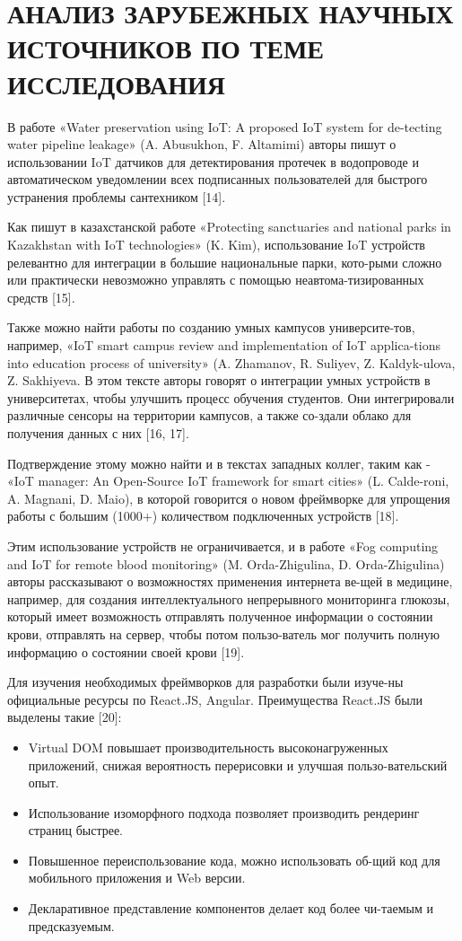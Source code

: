 \section{АНАЛИЗ ЗАРУБЕЖНЫХ НАУЧНЫХ ИСТОЧНИКОВ ПО ТЕМЕ ИССЛЕДОВАНИЯ}


В работе «Water preservation using IoT: A proposed IoT system for de-tecting water pipeline leakage» (A. Abusukhon, F. Altamimi) авторы пишут о использовании IoT датчиков для детектирования протечек в водопроводе и автоматическом уведомлении всех подписанных пользователей для быстрого устранения проблемы сантехником [14]. 

Как пишут в казахстанской работе «Protecting sanctuaries and national parks in Kazakhstan with IoT technologies» (K. Kim), использование IoT устройств релевантно для интеграции в большие национальные парки, кото-рыми сложно или практически невозможно управлять с помощью неавтома-тизированных средств [15].

Также можно найти работы по созданию умных кампусов университе-тов, например, «IoT smart campus review and implementation of IoT applica-tions into education process of university» (A. Zhamanov, R. Suliyev, Z. Kaldyk-ulova, Z. Sakhiyeva. В этом тексте авторы говорят о интеграции умных устройств в университетах, чтобы улучшить процесс обучения студентов. Они интегрировали различные сенсоры на территории кампусов, а также со-здали облако для получения данных с них [16, 17]. 

Подтверждение этому можно найти и в текстах западных коллег, таким как - «IoT manager: An Open-Source IoT framework for smart cities» (L. Calde-roni, A. Magnani, D. Maio), в которой говорится о новом фреймворке для упрощения работы с большим (1000+) количеством подключенных устройств [18]. 

Этим использование устройств не ограничивается, и в работе «Fog computing and IoT for remote blood monitoring» (M. Orda-Zhigulina, D. Orda-Zhigulina) авторы рассказывают о возможностях применения интернета ве-щей в медицине, например, для создания интеллектуального непрерывного мониторинга глюкозы, который имеет возможность отправлять полученное информации о состоянии крови, отправлять на сервер, чтобы потом пользо-ватель мог получить полную информацию о состоянии своей крови [19].

Для изучения необходимых фреймворков для разработки были изуче-ны официальные ресурсы по React.JS, Angular. Преимущества React.JS были выделены такие 	[20]:

\begin{itemize}
    \item Virtual DOM повышает производительность высоконагруженных приложений, снижая вероятность перерисовки и улучшая пользо-вательский опыт.
    \item Использование изоморфного подхода позволяет производить рендеринг страниц быстрее.
    \item Повышенное переиспользование кода, можно использовать об-щий код для мобильного приложения и Web версии.
    \item Декларативное представление компонентов делает код более чи-таемым и предсказуемым.
\end{itemize}
  
